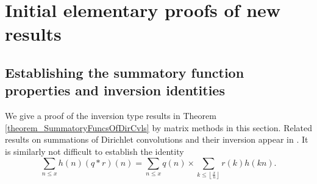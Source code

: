 \documentclass[11pt,reqno,a4letter]{article}
\numberwithin{figure}{section}
\numberwithin{table}{section}
\newcommand{\cf}{\textit{cf.\ }}
\newcommand{\Floor}[2]{\ensuremath{\left\lfloor \frac{#1}{#2} \right\rfloor}}
\theoremstyle{plain}
\numberwithin{theorem}{section}
\theoremstyle{definition}
\begin{document}
\section{Initial elementary proofs of new results} 
\label{Section_PrelimProofs_Config} 

\subsection{Establishing the summatory function properties and inversion identities} 
\label{subSection_PrelimProofs_Config_InversionTheorem}

We give a proof of the inversion type results in 
Theorem \ref{theorem_SummatoryFuncsOfDirCvls} 
by matrix methods in this section. 
Related results on summations of Dirichlet convolutions and their inversion appear in 
\cite[\S 2.14; \S 3.10; \S 3.12; \cf \S 4.9, p.\ 95]{APOSTOLANUMT}. 
It is similarly not difficult to establish the identity 
\[
\sum_{n \leq x} h(n) (q \ast r)(n) = 
     \sum_{n \leq x} q(n) \times \sum_{k \leq \Floor{x}{n}} r(k) h(kn). 
\]
\end{document}
